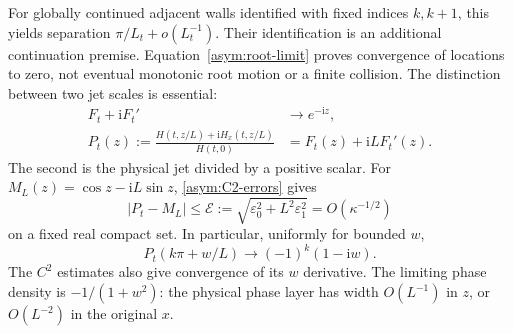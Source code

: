 \documentclass[11pt]{article}
\theoremstyle{definition}
\newcommand{\ii}{\mathrm i}
\begin{document}
For globally continued adjacent walls identified with fixed indices
$k,k+1$, this yields separation $\pi/L_t+o(L_t^{-1})$.
Their identification is an additional continuation premise.
Equation~\eqref{asym:root-limit} proves convergence of locations to zero,
not eventual monotonic root motion or a finite collision.
The distinction between two jet scales is essential:
\begin{align}
 F_t+\ii F_t'&\longrightarrow e^{-\ii z},\label{asym:rescaled-jet}\\
 P_t(z):=\frac{H(t,z/L)+\ii H_x(t,z/L)}{H(t,0)}
 &=F_t(z)+\ii L F_t'(z).\label{asym:physical-jet}
\end{align}
The second is the physical jet divided by a positive scalar.
For $M_L(z)=\cos z-\ii L\sin z$, \eqref{asym:C2-errors} gives
\begin{equation}\label{asym:jet-error}
 |P_t-M_L|\le\mathcal E:=
 \sqrt{\varepsilon_0^2+L^2\varepsilon_1^2}
 =O(\kappa^{-1/2})
\end{equation}
on a fixed real compact set.  In particular, uniformly for bounded $w$,
\begin{equation}\label{asym:interior-profile}
 P_t(k\pi+w/L)\longrightarrow(-1)^k(1-\ii w).
\end{equation}
The $C^2$ estimates also give convergence of its $w$ derivative.
The limiting phase density is $-1/(1+w^2)$: the physical phase layer
has width $O(L^{-1})$ in $z$, or $O(L^{-2})$ in the original $x$.
\end{document}
